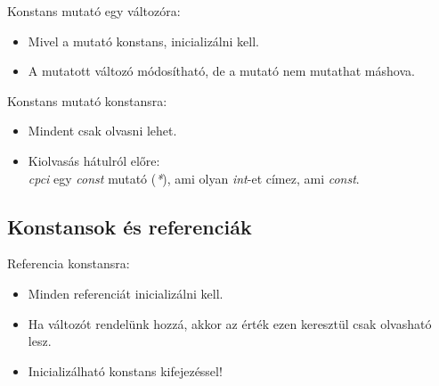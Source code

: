 \documentclass[usenames,dvipsnames,aspectratio=169]{beamer}
\begin{document}
\begin{frame}
    Konstans mutató egy változóra:
    \begin{itemize}
        \item Mivel a mutató konstans, inicializálni kell.
        \item A mutatott változó módosítható, de a mutató nem mutathat máshova.
    \end{itemize}
    \begin{exampleblock}{}
        \scriptsize
        
    \end{exampleblock}
\end{frame}

\begin{frame}
    Konstans mutató konstansra:
    \begin{itemize}
        \item Mindent csak olvasni lehet.
        \item Kiolvasás hátulról előre:\\ \emph{cpci} egy \emph{const} mutató (\emph{*}), ami olyan \emph{int}-et címez, ami \emph{const}.
    \end{itemize}
    \begin{exampleblock}{}
        \scriptsize
        
    \end{exampleblock}
\end{frame}

\subsection{Konstansok és referenciák}

\begin{frame}
    Referencia konstansra:
    \begin{itemize}
        \item Minden referenciát inicializálni kell.
        \item Ha változót rendelünk hozzá, akkor az érték ezen keresztül csak olvasható lesz.
        \item Inicializálható konstans kifejezéssel!
    \end{itemize}
    \begin{exampleblock}{}
        \scriptsize
        
    \end{exampleblock}
\end{frame}
\end{document}
